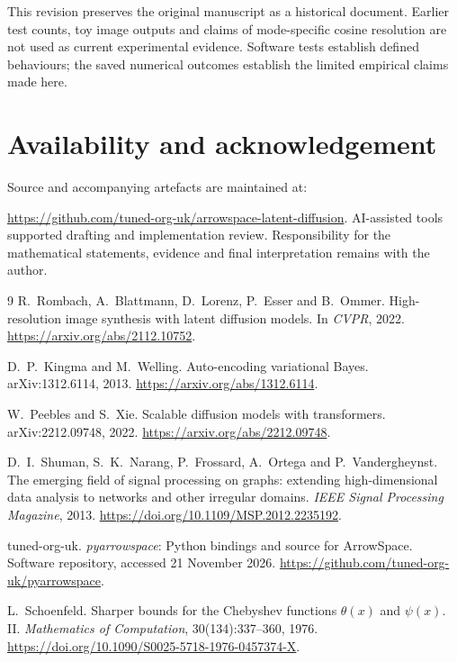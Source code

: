 \documentclass[10pt]{article}
\begin{document}
This revision preserves the original manuscript as a historical
document. Earlier test counts, toy image outputs and claims of
mode-specific cosine resolution are not used as current experimental
evidence. Software tests establish defined behaviours; the saved
numerical outcomes establish the limited empirical claims made here.

\section*{Availability and acknowledgement}

Source and accompanying artefacts are maintained at:
\par\noindent
\url{https://github.com/tuned-org-uk/arrowspace-latent-diffusion}.
AI-assisted tools supported drafting and implementation review.
Responsibility for the mathematical statements, evidence and final
interpretation remains with the author.

\begin{thebibliography}{9}
R.~Rombach, A.~Blattmann, D.~Lorenz, P.~Esser and B.~Ommer.
\newblock High-resolution image synthesis with latent diffusion models.
\newblock In \emph{CVPR}, 2022.
\newblock \url{https://arxiv.org/abs/2112.10752}.

D.~P.~Kingma and M.~Welling.
\newblock Auto-encoding variational Bayes.
\newblock arXiv:1312.6114, 2013.
\newblock \url{https://arxiv.org/abs/1312.6114}.

W.~Peebles and S.~Xie.
\newblock Scalable diffusion models with transformers.
\newblock arXiv:2212.09748, 2022.
\newblock \url{https://arxiv.org/abs/2212.09748}.

D.~I.~Shuman, S.~K.~Narang, P.~Frossard, A.~Ortega and P.~Vandergheynst.
\newblock The emerging field of signal processing on graphs: extending
high-dimensional data analysis to networks and other irregular domains.
\newblock \emph{IEEE Signal Processing Magazine}, 2013.
\newblock \url{https://doi.org/10.1109/MSP.2012.2235192}.

tuned-org-uk.
\newblock \emph{pyarrowspace}: Python bindings and source for ArrowSpace.
\newblock Software repository, accessed 21 November 2026.
\newblock \url{https://github.com/tuned-org-uk/pyarrowspace}.

L.~Schoenfeld.
\newblock Sharper bounds for the Chebyshev functions $\theta(x)$ and
$\psi(x)$. II.
\newblock \emph{Mathematics of Computation}, 30(134):337--360, 1976.
\newblock \url{https://doi.org/10.1090/S0025-5718-1976-0457374-X}.
\end{thebibliography}
\end{document}
